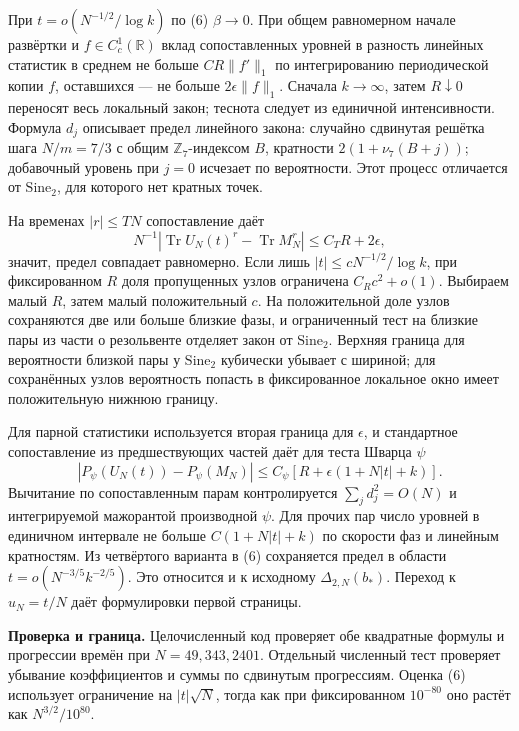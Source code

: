 \documentclass[11pt,a4paper]{article}
\newcommand{\Tr}{\operatorname{Tr}}
\newcommand{\R}{\mathbb R}
\newcommand{\si}{\mathrm{Sine}_2}
\newcommand{\subt}[1]{\par\medskip\noindent\textbf{#1.}\quad}
\newcommand{\Zp}{\mathbb Z_7}
\begin{document}
При \(t=o(N^{-1/2}/\log k)\) по (6) \(\beta\to0\). При общем равномерном начале развёртки и \(f\in C_c^1(\R)\) вклад сопоставленных уровней в разность линейных статистик в среднем не больше \(C R\|f'\|_1\) по интегрированию периодической копии \(f\), оставшихся --- не больше \(2\epsilon\|f\|_1\). Сначала \(k\to\infty\), затем \(R\downarrow0\) переносят весь локальный закон; теснота следует из единичной интенсивности. Формула \(d_j\) описывает предел линейного закона: случайно сдвинутая решётка шага \(N/m=7/3\) с общим \(\Zp\)-индексом \(B\), кратности \(2(1+\nu_7(B+j))\); добавочный уровень при \(j=0\) исчезает по вероятности. Этот процесс отличается от \(\si\), для которого нет кратных точек.

На временах \(|r|\le TN\) сопоставление даёт
\[
        N^{-1}|\Tr U_N(t)^r-\Tr M_N^r|\le C_T R+2\epsilon,
\]
значит, предел совпадает равномерно. Если лишь \(|t|\le c N^{-1/2}/\log k\), при фиксированном \(R\) доля пропущенных узлов ограничена \(C_Rc^2+o(1)\). Выбираем малый \(R\), затем малый положительный \(c\). На положительной доле узлов сохраняются две или больше близкие фазы, и ограниченный тест на близкие пары из части о резольвенте отделяет закон от \(\si\). Верхняя граница для вероятности близкой пары у \(\si\) кубически убывает с шириной; для сохранённых узлов вероятность попасть в фиксированное локальное окно имеет положительную нижнюю границу.

Для парной статистики используется вторая граница для \(\epsilon\), и стандартное сопоставление из предшествующих частей даёт для теста Шварца \(\psi\)
\[
   |P_\psi(U_N(t))-P_\psi(M_N)|\le C_\psi[R+\epsilon(1+N|t|+k)] .
\]
Вычитание по сопоставленным парам контролируется \(\sum_j d_j^2=O(N)\) и интегрируемой мажорантой производной \(\psi\). Для прочих пар число уровней в единичном интервале не больше \(C(1+N|t|+k)\) по скорости фаз и линейным кратностям. Из четвёртого варианта в (6) сохраняется предел в области \(t=o(N^{-3/5}k^{-2/5})\). Это относится и к исходному \(\Delta_{2,N}(b_*)\). Переход к \(u_N=t/N\) даёт формулировки первой страницы.

\subt{Проверка и граница}
Целочисленный код проверяет обе квадратные формулы и прогрессии времён при \(N=49,343,2401\). Отдельный численный тест проверяет убывание коэффициентов и суммы по сдвинутым прогрессиям. Оценка (6) использует ограничение на \(|t|\sqrt N\), тогда как при фиксированном \(10^{-80}\) оно растёт как \(N^{3/2}/10^{80}\).
\end{document}
